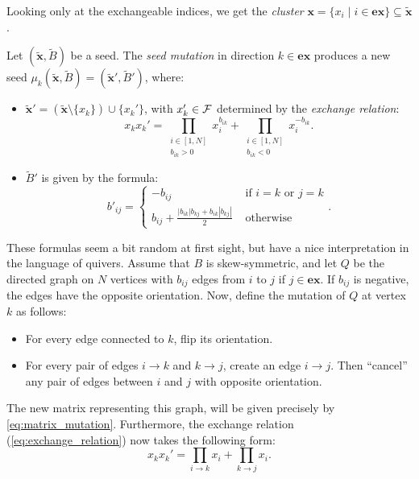 \documentclass{article}
\newcommand{\ex}{\mathbf{ex}}
\newcommand{\bx}{\mathbf{x}}
\newcommand{\tbx}{\tilde{\bx}}
\newcommand{\tB}{\tilde{B}}
\begin{document}
Looking only at the exchangeable indices, we get the \emph{cluster}
$\mathbf{x} = \{x_i \mid i \in \ex \} \subseteq \tilde{\mathbf{x}}$.
\begin{definition}
    Let $(\tilde{\mathbf{x}}, \tilde{B})$ be a seed.
    The \emph{seed mutation} in direction $k \in \ex$
    produces a new seed $\mu_k(\tilde{\mathbf{x}}, \tB) = (\tilde{\bx}', \tB')$, where:
    \begin{itemize}
        \item $\tbx' = (\tbx \setminus \{x_k\}) \cup \{x_k'\}$,
              with $x_k' \in \mathcal{F}$ determined by the \emph{exchange relation}:
              \begin{equation}
                  \label{eq:exchange_relation}
                  x_kx_k' = \prod_{\substack{i \in [1,N] \\ b_{ik} > 0}}x_i^{b_{ik}} + \prod_{\substack{i \in [1, N] \\ b_{ik} < 0}}x_i^{-b_{ik}}.
              \end{equation}
        \item $\tB'$ is given by the formula:
              \begin{equation}
                  \label{eq:matrix_mutation}
                  b'_{ij} =
                  \begin{cases}
                      -b_{ij}                                            & \text{ if } i=k \text{ or } j=k \\
                      b_{ij} + \frac{|b_{ik}|b_{kj} + b_{ik}|b_{kj}|}{2} & \text{ otherwise}
                  \end{cases}
                  .
              \end{equation}
    \end{itemize}
\end{definition}

\begin{remark}
    These formulas seem a bit random at first sight,
    but have a nice interpretation in the language of quivers.
    Assume that $B$ is skew-symmetric,
    and let $Q$ be the directed graph on $N$ vertices with $b_{ij}$ edges
    from $i$ to $j$ if $j \in \ex$. If $b_{ij}$ is negative,
    the edges have the opposite orientation.
    Now, define the mutation of $Q$ at vertex $k$ as follows:
    \begin{itemize}
        \item For every edge connected to $k$, flip its orientation.
        \item For every pair of edges $i\to k$ and $k\to j$, create an edge $i \to j$.
              Then ``cancel'' any pair of edges between $i$ and $j$ with opposite orientation.
    \end{itemize}
    The new matrix representing this graph, will be given precisely by \cref{eq:matrix_mutation}.
    Furthermore, the exchange relation (\ref{eq:exchange_relation}) now takes the following form:
    \begin{equation*}
        x_kx_k' = \prod_{i \to k}x_i + \prod_{k \to j}x_i.
    \end{equation*}
\end{remark}
\end{document}
